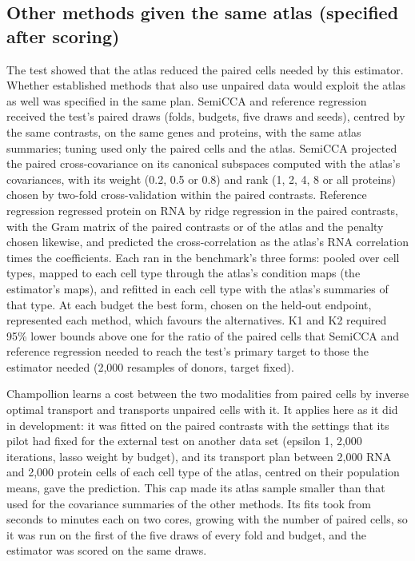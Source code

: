 \subsection*{Other methods given the same atlas (specified after scoring)}
The test showed that the atlas reduced the paired cells needed by this estimator. Whether established methods that also use unpaired data would exploit the atlas as well was specified in the same plan. SemiCCA and reference regression received the test's paired draws (folds, budgets, five draws and seeds), centred by the same contrasts, on the same genes and proteins, with the same atlas summaries; tuning used only the paired cells and the atlas. SemiCCA\cite{kimura2013} projected the paired cross-covariance on its canonical subspaces computed with the atlas's covariances, with its weight (0.2, 0.5 or 0.8) and rank (1, 2, 4, 8 or all proteins) chosen by two-fold cross-validation within the paired contrasts. Reference regression regressed protein on RNA by ridge regression in the paired contrasts, with the Gram matrix of the paired contrasts or of the atlas and the penalty chosen likewise, and predicted the cross-correlation as the atlas's RNA correlation times the coefficients. Each ran in the benchmark's three forms: pooled over cell types, mapped to each cell type through the atlas's condition maps (the estimator's maps), and refitted in each cell type with the atlas's summaries of that type. At each budget the best form, chosen on the held-out endpoint, represented each method, which favours the alternatives. K1 and K2 required 95\% lower bounds above one for the ratio of the paired cells that SemiCCA and reference regression needed to reach the test's primary target to those the estimator needed (2,000 resamples of donors, target fixed).

Champollion\cite{champollion} learns a cost between the two modalities from paired cells by inverse optimal transport and transports unpaired cells with it. It applies here as it did in development: it was fitted on the paired contrasts with the settings that its pilot had fixed for the external test on another data set (epsilon 1, 2,000 iterations, lasso weight by budget), and its transport plan between 2,000 RNA and 2,000 protein cells of each cell type of the atlas, centred on their population means, gave the prediction. This cap made its atlas sample smaller than that used for the covariance summaries of the other methods. Its fits took from seconds to minutes each on two cores, growing with the number of paired cells, so it was run on the first of the five draws of every fold and budget, and the estimator was scored on the same draws.


